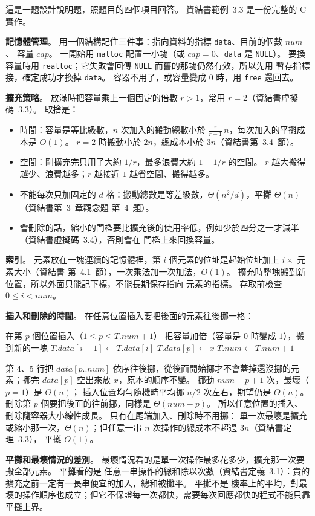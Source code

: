 \begin{pastsoln}
這是一題設計說明題，照題目的四個項目回答。 資結書範例~3.3 是一份完整的 C 實作。

\textbf{記憶體管理}。 用一個結構記住三件事：指向資料的指標 \texttt{data}、目前的個數 $\mathit{num}$、
容量 $\mathit{cap}$。 一開始用 \texttt{malloc} 配置一小塊（或 $\mathit{cap} = 0$、\texttt{data} 是
\texttt{NULL}）。 要換容量時用 \texttt{realloc}；它失敗會回傳 \texttt{NULL} 而舊的那塊仍然有效，所以先用
暫存指標接，確定成功才換掉 \texttt{data}。 容器不用了，或容量變成 $0$ 時，用 \texttt{free} 還回去。

\textbf{擴充策略}。 放滿時把容量乘上一個固定的倍數 $r > 1$，常用 $r = 2$（資結書虛擬碼~3.3）。 取捨是：
\begin{itemize}
\item 時間：容量是等比級數，$n$ 次加入的搬動總數小於 $\frac{r}{r - 1}\, n$，每次加入的平攤成本是 $O(1)$。
$r = 2$ 時搬動小於 $2n$，總成本小於 $3n$（資結書第~3.4~節）。
\item 空間：剛擴充完只用了大約 $1/r$，最多浪費大約 $1 - 1/r$ 的空間。 $r$ 越大搬得越少、浪費越多；$r$ 越接近
$1$ 越省空間、搬得越多。
\item 不能每次只加固定的 $d$ 格：搬動總數是等差級數，$\Theta(n^2/d)$，平攤 $\Theta(n)$（資結書第~3~章觀念題
第~4~題）。
\item 會刪除的話，縮小的門檻要比擴充後的使用率低，例如少於四分之一才減半（資結書虛擬碼~3.4），否則會在
門檻上來回換容量。
\end{itemize}

\textbf{索引}。 元素放在一塊連續的記憶體裡，第 $i$ 個元素的位址是起始位址加上 $i \times$ 元素大小（資結書
第~4.1~節），一次乘法加一次加法，$O(1)$。 擴充時整塊搬到新位置，所以外面只能記下標，不能長期保存指向
元素的指標。 存取前檢查 $0 \le i < \mathit{num}$。

\textbf{插入和刪除的時間}。 在任意位置插入要把後面的元素往後挪一格：
\begin{pseudo}[unbreakable]{在第 $p$ 個位置插入（$1 \le p \le T.\mathit{num} + 1$）}
        \State 把容量加倍（容量是 $0$ 時變成 $1$），搬到新的一塊
    \EndIf
        \State $T.\mathit{data}[i + 1] \gets T.\mathit{data}[i]$ 
    \EndFor
    \State $T.\mathit{data}[p] \gets x$
    \State $T.\mathit{num} \gets T.\mathit{num} + 1$
\EndProcedure
\end{pseudo}
第 4、5 行把 $\mathit{data}[p..\mathit{num}]$ 依序往後挪，從後面開始挪才不會蓋掉還沒挪的元素；挪完
$\mathit{data}[p]$ 空出來放 $x$，原本的順序不變。 挪動 $\mathit{num} - p + 1$ 次，最壞（$p = 1$）是 $\Theta(n)$；
插入位置均勻隨機時平均挪 $n/2$ 次左右，期望仍是 $\Theta(n)$。 刪除第 $p$ 個要把後面的往前挪，同樣是
$\Theta(\mathit{num} - p)$。 所以任意位置的插入、刪除隨容器大小線性成長。 只有在尾端加入、刪除時不用挪：
單一次最壞是擴充或縮小那一次，$\Theta(n)$；但任意一串 $n$ 次操作的總成本不超過 $3n$（資結書定理~3.3），
平攤 $O(1)$。

\textbf{平攤和最壞情況的差別}。 最壞情況看的是單一次操作最多花多少，擴充那一次要搬全部元素。 平攤看的是
任意一串操作的總和除以次數（資結書定義~3.1）：貴的擴充之前一定有一長串便宜的加入，總和被攤平。 平攤不是
機率上的平均，對最壞的操作順序也成立；但它不保證每一次都快，需要每次回應都快的程式不能只靠平攤上界。
\end{pastsoln}
